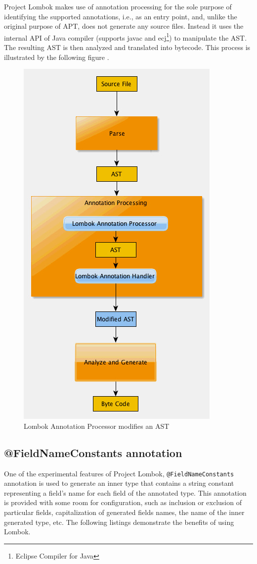 Project Lombok makes use of annotation processing for the sole purpose of identifying the supported annotations, i.e., as an entry point, and, unlike the original purpose of APT, does not generate any source files.
Instead it uses the internal API of Java compiler (supports javac and ecj\footnote{Eclipse Compiler for Java}) to manipulate the AST.
The resulting AST is then analyzed and translated into bytecode.
This process is illustrated by the following figure \cite{lombok-fig}.
\begin{figure}[H]\centering
    \includegraphics[scale=0.5]{images/lombok.jpg}
    \caption{Lombok Annotation Processor modifies an AST}
    \label{fig:lombok}
\end{figure}

\subsection{@FieldNameConstants annotation}
One of the experimental features of Project Lombok, \texttt{@FieldNameConstants} \cite{lombok-fnc} annotation is used to generate an inner type that contains a string constant representing a field’s name for each field of the annotated type.
This annotation is provided with some room for configuration, such as inclusion or exclusion of particular fields, capitalization of generated fields names, the name of the inner generated type, etc.
The following listings demonstrate the benefits of using Lombok.

